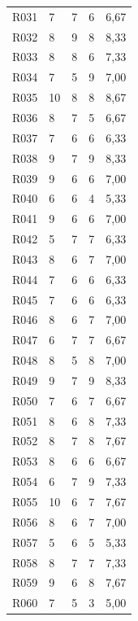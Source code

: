 {\begin{longtable}{L{1.05cm}R{2.1cm}R{2.1cm}R{2.1cm}R{3.0cm}}
R031 & 7 & 7 & 6 & 6,67 \\
R032 & 8 & 9 & 8 & 8,33 \\
R033 & 8 & 8 & 6 & 7,33 \\
R034 & 7 & 5 & 9 & 7,00 \\
R035 & 10 & 8 & 8 & 8,67 \\
R036 & 8 & 7 & 5 & 6,67 \\
R037 & 7 & 6 & 6 & 6,33 \\
R038 & 9 & 7 & 9 & 8,33 \\
R039 & 9 & 6 & 6 & 7,00 \\
R040 & 6 & 6 & 4 & 5,33 \\
R041 & 9 & 6 & 6 & 7,00 \\
R042 & 5 & 7 & 7 & 6,33 \\
R043 & 8 & 6 & 7 & 7,00 \\
R044 & 7 & 6 & 6 & 6,33 \\
R045 & 7 & 6 & 6 & 6,33 \\
R046 & 8 & 6 & 7 & 7,00 \\
R047 & 6 & 7 & 7 & 6,67 \\
R048 & 8 & 5 & 8 & 7,00 \\
R049 & 9 & 7 & 9 & 8,33 \\
R050 & 7 & 6 & 7 & 6,67 \\
R051 & 8 & 6 & 8 & 7,33 \\
R052 & 8 & 7 & 8 & 7,67 \\
R053 & 8 & 6 & 6 & 6,67 \\
R054 & 6 & 7 & 9 & 7,33 \\
R055 & 10 & 6 & 7 & 7,67 \\
R056 & 8 & 6 & 7 & 7,00 \\
R057 & 5 & 6 & 5 & 5,33 \\
R058 & 8 & 7 & 7 & 7,33 \\
R059 & 9 & 6 & 8 & 7,67 \\
R060 & 7 & 5 & 3 & 5,00 \\
\end{longtable}
}
